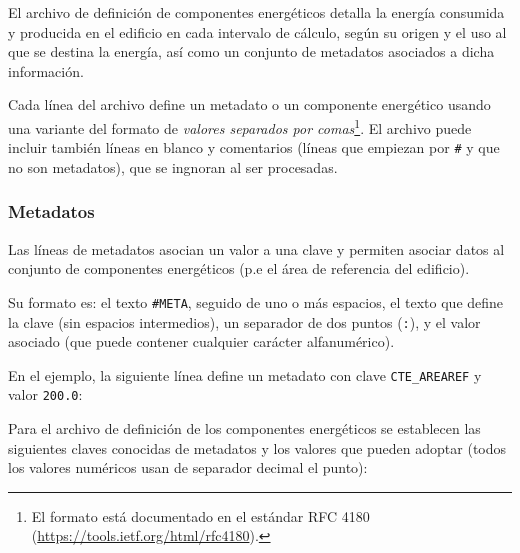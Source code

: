 \documentclass[10pt,notitlepage,oneside,a4paper]{article}
\begin{document}
El archivo de definición de componentes energéticos detalla la energía consumida y producida en el edificio en cada intervalo de cálculo, según su origen y el uso al que se destina la energía, así como un conjunto de metadatos asociados a dicha información.

Cada línea del archivo define un metadato o un componente energético usando una variante del formato de \textit{valores separados por comas}\footnote{El formato está documentado en el estándar RFC 4180 (\url{https://tools.ietf.org/html/rfc4180}).}. El archivo puede incluir también líneas en blanco y comentarios (líneas que empiezan por \texttt{\#} y que no son metadatos), que se ingnoran al ser procesadas.



\subsubsection{Metadatos}

Las líneas de metadatos asocian un valor a una clave y permiten asociar datos al conjunto de componentes energéticos (p.e el área de referencia del edificio).

Su formato es: el texto \texttt{\#META}, seguido de uno o más espacios, el texto que define la clave (sin espacios intermedios), un separador de dos puntos (\texttt{:}), y el valor asociado (que puede contener cualquier carácter alfanumérico).

En el ejemplo, la siguiente línea define un metadato con clave \texttt{CTE\_AREAREF} y valor \texttt{200.0}:



Para el archivo de definición de los componentes energéticos se establecen las siguientes claves conocidas de metadatos y los valores que pueden adoptar (todos los valores numéricos usan de separador decimal el punto):
\end{document}
